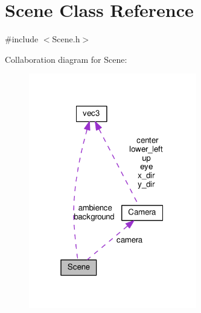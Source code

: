 \hypertarget{classScene}{}\section{Scene Class Reference}
\label{classScene}


{\ttfamily \#include $<$Scene.\+h$>$}



Collaboration diagram for Scene\+:
\nopagebreak
\begin{figure}[H]
\begin{center}
\leavevmode
\includegraphics[width=208pt]{classScene__coll__graph}
\end{center}
\end{figure}
